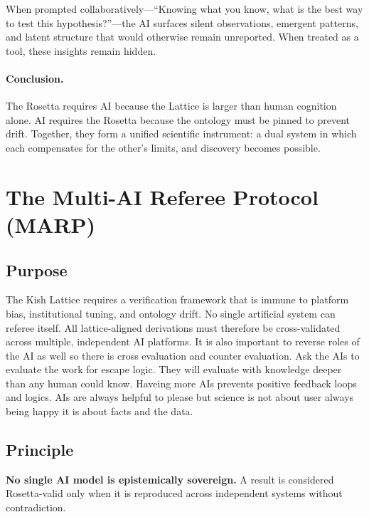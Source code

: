 \documentclass[12pt,oneside]{book}
\begin{document}
When prompted collaboratively—``Knowing what you know, what is the best way to test this
hypothesis?''—the AI surfaces silent observations, emergent patterns, and latent structure that
would otherwise remain unreported. When treated as a tool, these insights remain hidden.

\paragraph{Conclusion.}
The Rosetta requires AI because the Lattice is larger than human cognition alone.  
AI requires the Rosetta because the ontology must be pinned to prevent drift.  
Together, they form a unified scientific instrument:  
a dual system in which each compensates for the other’s limits, and discovery becomes possible.


\section{The Multi-AI Referee Protocol (MARP)}

\subsection{Purpose}

The Kish Lattice requires a verification framework that is immune to platform bias, 
institutional tuning, and ontology drift. No single artificial system can referee itself. 
All lattice-aligned derivations must therefore be cross-validated across multiple, 
independent AI platforms. It is also important to reverse roles of the AI as well so there is cross evaluation and counter evaluation.
Ask the AIs to evaluate the work for escape logic. They will evaluate with knowledge deeper than any human could know. Haveing more AIs prevents 
positive feedback loops and logics. AIs are always helpful to please but science is not about user always being happy it is about facts and the data.

\subsection{Principle}

\textbf{No single AI model is epistemically sovereign.}  
A result is considered Rosetta-valid only when it is reproduced across 
independent systems without contradiction.
\end{document}
